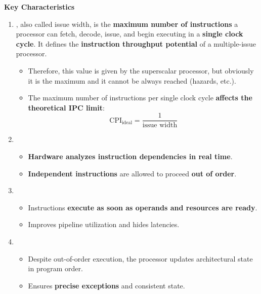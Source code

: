 \highspace
\begin{flushleft}
    \textcolor{Green3}{ \textbf{Key Characteristics}}
\end{flushleft}
\begin{enumerate}
    \item {}, also called issue width, is the \textbf{maximum number of instructions} a processor can fetch, decode, issue, and begin executing in a \textbf{single clock cycle}. It defines the \textbf{instruction throughput potential} of a multiple-issue processor.
    \begin{itemize}
        \item Therefore, this value is given by the superscalar processor, but obviously it is the maximum and it cannot be always reached (hazards, etc.).
        \item The maximum number of instructions per single clock cycle \textbf{affects the theoretical IPC limit}:
        \begin{equation*}
            \text{CPI}_{\text{ideal}} = \frac{1}{\text{issue width}}
        \end{equation*}
    \end{itemize}
 
    \item {}
    \begin{itemize}
        \item \textbf{Hardware analyzes instruction dependencies in real time}.
        \item \textbf{Independent instructions} are allowed to proceed \textbf{out of order}.
    \end{itemize}
 
    \item {}
    \begin{itemize}
        \item Instructions \textbf{execute as soon as operands and resources are ready}.
        \item Improves pipeline utilization and hides latencies.
    \end{itemize}
 
    \item {}
    \begin{itemize}
        \item Despite out-of-order execution, the processor updates architectural state in program order.
        \item Ensures \textbf{precise exceptions} and consistent state.
    \end{itemize}
\end{enumerate}

